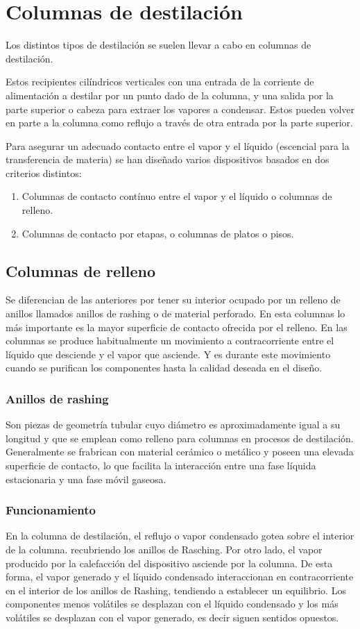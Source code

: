 \documentclass[11pt,openany]{book}
\begin{document}
\section {Columnas de destilación}

Los distintos tipos de destilación se suelen llevar a cabo en columnas de destilación.

Estos recipientes cilíndricos verticales con una entrada de la corriente de alimentación a 
destilar por un punto dado de la columna, y una salida por la parte superior o cabeza para extraer 
los vapores a condensar. Estos pueden volver en parte a la columna como reflujo a través de otra entrada por la 
parte superior.

Para asegurar un adecuado contacto entre el vapor y el líquido (escencial para la transferencia de materia) se han 
diseñado varios dispositivos basados en dos criterios distintos:
\begin{enumerate}
\item Columnas de contacto contínuo entre el vapor y el líquido o columnas de relleno.
\item Columnas de contacto por etapas, o columnas de platos o pisos.
\end{enumerate}
\subsection{Columnas de relleno}
Se diferencian de las anteriores por tener su interior ocupado por un relleno de anillos
llamados anillos de rashing o de material perforado.
En esta columnas lo más importante es la mayor superficie de contacto ofrecida por el relleno.
En las columnas se produce habitualmente un movimiento a contracorriente entre el líquido que 
desciende y el vapor que asciende. Y es durante este movimiento cuando se purifican los 
componentes hasta la calidad deseada en el diseño.
\subsubsection{Anillos de rashing}
Son piezas de geometría tubular cuyo diámetro es aproximadamente igual a su longitud y que se 
emplean como relleno para columnas en procesos de destilación.
Generalmente se frabrican con material cerámico o metálico y poseen una elevada superficie de 
contacto, lo que facilita la interacción entre una fase líquida estacionaria y una fase móvil gaseosa.
\subsubsection{Funcionamiento}
En la columna de destilación, el reflujo o vapor condensado gotea sobre el interior de la columna.
recubriendo los anillos de Rasching.
Por otro lado, el vapor producido por la calefacción del dispositivo asciende por la columna.
De esta forma, el vapor generado y el líquido condensado interaccionan en contracorriente en el 
interior de los anillos de Rashing, tendiendo a establecer un equilibrio. Los componentes menos 
volátiles se desplazan con el líquido condensado y los más volátiles se desplazan con el vapor generado, 
es decir siguen sentidos opuestos.
\end{document}
